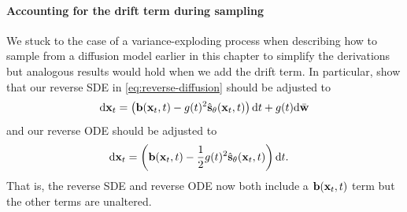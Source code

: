 \paragraph{Accounting for the drift term during sampling}
We stuck to the case of a variance-exploding process when describing how to sample from a diffusion model earlier in this chapter to simplify the derivations but analogous results would hold when we add the drift term. In particular, \citet{song2020score} show that our reverse SDE in \cref{eq:reverse-diffusion} should be adjusted to
\begin{align} \label{eq:reverse-diffusion-with-drift}
    \mathrm{d}{\mathbf{x}}_t = \left( {\mathbf{b}}({\mathbf{x}}_t, t) - g(t)^2 \hat{{\mathbf{s}}}_\theta({\mathbf{x}}_t, t) \right) \mathrm{d}t + g(t) \mathrm{d}\bar{{\mathbf{w}}}
\end{align}
and our reverse ODE should be adjusted to
\begin{align}
    \mathrm{d}{\mathbf{x}}_t &= \left( {\mathbf{b}}({\mathbf{x}}_t, t) - \frac{1}{2} g(t)^2 \hat{{\mathbf{s}}}_\theta({\mathbf{x}}_t, t) \right) \mathrm{d}t.
\end{align}
That is, the reverse SDE and reverse ODE now both include a ${\mathbf{b}}({\mathbf{x}}_t, t)$ term but the other terms are unaltered.

